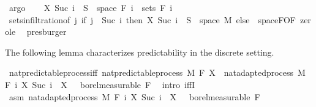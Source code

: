 \begin{isabellebody}
\ argo\isanewline
\ \ \isamarkupfalse%
\ {\isachardoublequoteopen}X\ {\isacharparenleft}{\kern0pt}Suc\ i{\isacharparenright}{\kern0pt}\ {\isacharminus}{\kern0pt}{\isacharbackquote}{\kern0pt}\ S\ {\isasyminter}\ space\ {\isacharparenleft}{\kern0pt}F\ i{\isacharparenright}{\kern0pt}\ {\isasymin}\ sets\ {\isacharparenleft}{\kern0pt}F\ i{\isacharparenright}{\kern0pt}{\isachardoublequoteclose}\ \isamarkupfalse%
\ sets{\isacharunderscore}{\kern0pt}in{\isacharunderscore}{\kern0pt}filtration{\isacharbrackleft}{\kern0pt}of\ {\isachardoublequoteopen}{\isasymlambda}j{\isachardot}{\kern0pt}\ if\ j\ {\isacharequal}{\kern0pt}\ Suc\ i\ then\ {\isacharparenleft}{\kern0pt}X\ {\isacharparenleft}{\kern0pt}Suc\ i{\isacharparenright}{\kern0pt}\ {\isacharminus}{\kern0pt}{\isacharbackquote}{\kern0pt}\ S\ {\isasyminter}\ space\ M{\isacharparenright}{\kern0pt}\ else\ {\isacharbraceleft}{\kern0pt}{\isacharbraceright}{\kern0pt}{\isachardoublequoteclose}{\isacharbrackright}{\kern0pt}\ space{\isacharunderscore}{\kern0pt}F{\isacharbrackleft}{\kern0pt}OF\ zero{\isacharunderscore}{\kern0pt}le{\isacharbrackright}{\kern0pt}\ \isamarkupfalse%
\ presburger\isanewline
{}\isamarkupfalse%
%
\endisatagproof
{\isafoldproof}%
%
\isadelimproof
%
\endisadelimproof
%
\begin{isamarkuptext}%
The following lemma characterizes predictability in the discrete setting.%
\end{isamarkuptext}\isamarkuptrue%
\isamarkupfalse%
\ nat{\isacharunderscore}{\kern0pt}predictable{\isacharunderscore}{\kern0pt}process{\isacharunderscore}{\kern0pt}iff{\isacharcolon}{\kern0pt}\ {\isachardoublequoteopen}nat{\isacharunderscore}{\kern0pt}predictable{\isacharunderscore}{\kern0pt}process\ M\ F\ X\ {\isasymlongleftrightarrow}\ nat{\isacharunderscore}{\kern0pt}adapted{\isacharunderscore}{\kern0pt}process\ M\ F\ {\isacharparenleft}{\kern0pt}{\isasymlambda}i{\isachardot}{\kern0pt}\ X\ {\isacharparenleft}{\kern0pt}Suc\ i{\isacharparenright}{\kern0pt}{\isacharparenright}{\kern0pt}\ {\isasymand}\ X\ {}\ {\isasymin}\ borel{\isacharunderscore}{\kern0pt}measurable\ {\isacharparenleft}{\kern0pt}F\ {}{\isacharparenright}{\kern0pt}{\isachardoublequoteclose}\isanewline
%
\isadelimproof
%
\endisadelimproof
%
\isatagproof
{}\isamarkupfalse%
\ {\isacharparenleft}{\kern0pt}intro\ iffI{\isacharparenright}{\kern0pt}\isanewline
\ \ \isamarkupfalse%
\ asm{\isacharcolon}{\kern0pt}\ {\isachardoublequoteopen}nat{\isacharunderscore}{\kern0pt}adapted{\isacharunderscore}{\kern0pt}process\ M\ F\ {\isacharparenleft}{\kern0pt}{\isasymlambda}i{\isachardot}{\kern0pt}\ X\ {\isacharparenleft}{\kern0pt}Suc\ i{\isacharparenright}{\kern0pt}{\isacharparenright}{\kern0pt}\ {\isasymand}\ X\ {}\ {\isasymin}\ borel{\isacharunderscore}{\kern0pt}measurable\ {\isacharparenleft}{\kern0pt}F\ {}{\isacharparenright}{\kern0pt}{\isachardoublequoteclose}\isanewline

\end{isabellebody}

